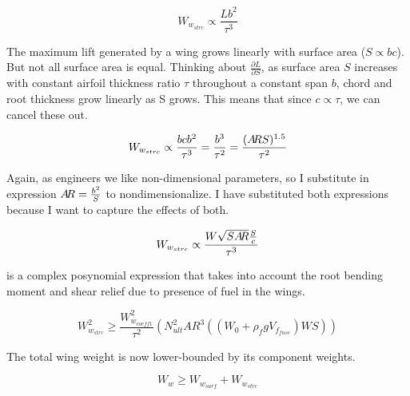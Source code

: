 
\begin{equation}
W_{w_{strc}} \propto \frac{L b^2}{\tau^3}
\end{equation}

The maximum lift generated by a wing grows linearly with surface area ($S\propto bc$). But not all surface
area is equal. Thinking about $\frac{\partial L}{\partial S}$, as surface area $S$ increases
with constant airfoil thickness ratio $\tau$ throughout a constant span $b$, chord and
root thickness grow linearly as S grows. This means that since $c \propto \tau$, we can cancel these out.

\begin{equation}
W_{w_{strc}} \propto \frac{b c b^2}{\tau^3} = \frac{b^3}{\tau^2} = \frac{(A\hspace{-2.0pt}R S)^{1.5}}{\tau^2}
\end{equation}

Again, as engineers we like non-dimensional parameters, so I substitute in expression
$A\hspace{-2.0pt}R = \frac{b^2}{S}$ to nondimensionalize. I have substituted both
expressions because I want to capture the effects of both.

\begin{equation}
W_{w_{strc}} \propto \frac{W \sqrt{SA\hspace{-2.0pt}R} \frac{S}{c}}{\tau^3}
\end{equation}


is a complex posynomial expression that takes into account the root
bending moment and shear relief due to presence of fuel in the wings.

\begin{equation} W_{w_{strc}}^2 \geq \frac{W_{w_{coeff1}}^2}{\tau^2} (N_{ult}^2 AR ^ 3 ((W_0+\rho_fgV_{f_{fuse}}) W S)) \label{e:wwstrc} \end{equation}

The total wing weight is now lower-bounded by its component weights.

\begin{equation} W_w \geq W_{w_{surf}} + W_{w_{strc}} \label{e:ww} \end{equation}

